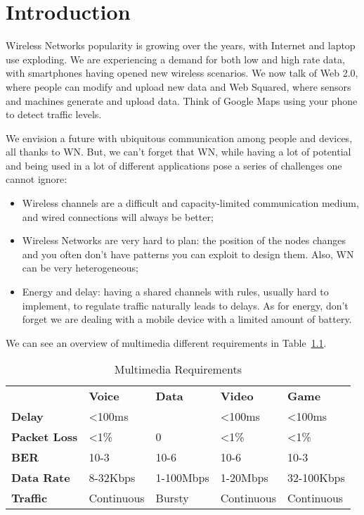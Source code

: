 \chapter{Introduction}
Wireless Networks popularity is growing over the years, with Internet 
and laptop use exploding. We are experiencing a demand for both low and high 
rate data, with smartphones having opened new wireless scenarios. We now talk of 
Web 2.0, where people can modify and upload new data and Web Squared, where 
sensors and machines generate and upload data. Think of Google Maps using your 
phone to detect traffic levels.
	
We envision a future with ubiquitous communication among people and 
devices, all thanks to WN. But, we can't forget that WN, while having a lot of 
potential and being used in a lot of different applications pose a series of 
challenges one cannot ignore:
	 
\begin{itemize}
\item Wireless channels are a difficult and capacity-limited 
  communication medium, and wired connections will always be better;
\item Wireless Networks are very hard to plan: the position of 
  the nodes changes and you often don't have patterns you can exploit to design 
  them. Also, WN can be very heterogeneous;
\item Energy and delay: having a shared channels with rules, 
  usually hard to implement, to regulate traffic naturally leads to delays. As
  for energy, don't forget we are dealing with a mobile device with a limited
  amount of battery.
\end{itemize}

We can see an overview of multimedia different requirements in 
Table~\ref{tab:intro:mmreq}.

\begin{table}[t]
\centering
\begin{tabular}{l|l|l|l|l|}
\cline{2-5}
                     & \textbf{Voice} & \textbf{Data} & \textbf{Video} & \textbf{Game}  \\ \cline{2-5} 
\textbf{Delay}       & \textless100ms &               & \textless100ms & \textless100ms \\ \cline{2-5} 
\textbf{Packet Loss} & \textless1\%   & 0             & \textless1\%   & \textless1\%   \\ \cline{2-5} 
\textbf{BER}         & 10-3           & 10-6          & 10-6           & 10-3           \\ \cline{2-5} 
\textbf{Data Rate}   & 8-32Kbps       & 1-100Mbps     & 1-20Mbps       & 32-100Kbps     \\ \cline{2-5} 
\textbf{Traffic}     & Continuous     & Bursty        & Continuous     & Continuous     \\ \cline{2-5} 
\end{tabular}
\caption{Multimedia Requirements}
\label{tab:intro:mmreq}
\end{table}

